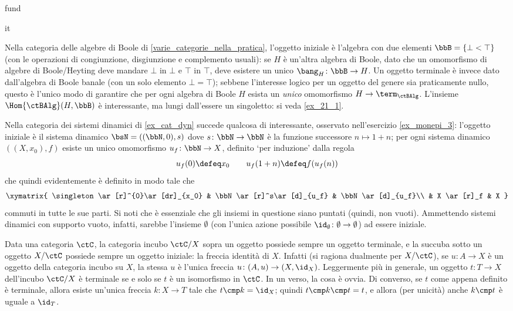 \begin{hExamples}{fund}
\begin{enumtag}{it}
		\item\label{it_4} Nella categoria delle algebre di Boole di \ref{varie_categorie_nella_pratica}, l'oggetto iniziale è l'algebra con due elementi \(\bbB=\{\bot < \top\}\) (con le operazioni di congiunzione, disgiunzione e complemento usuali): se \(H\) è un'altra algebra di Boole, dato che un omomorfismo di algebre di Boole/Heyting deve mandare \(\bot\) in \(\bot\) e \(\top\) in \(\top\), deve esistere un unico \(\bang_H \colon \bbB \to H\). Un oggetto terminale è invece dato dall'algebra di Boole banale (con un solo elemento \(\bot=\top\)); sebbene l'interesse logico per un oggetto del genere sia praticamente nullo, questo è l'unico modo di garantire che per ogni algebra di Boole \(H\) esista un \emph{unico} omomorfismo \(H \to \term_\ctBAlg\). L'insieme \(\Hom{\ctBAlg}(H,\bbB)\) è interessante, ma lungi dall'essere un singoletto: si veda \ref{ex_21_1}.
		\item\label{it_5} Nella categoria dei sistemi dinamici di \ref{ex_cat_dyn} succede qualcosa di interessante, osservato nell'esercizio \ref{ex_monepi_3}: l'oggetto iniziale è il sistema dinamico \(\bsN=((\bbN,0),s)\) dove \(s \colon \bbN \to \bbN\) è la funzione successore \(n\mapsto 1+n\);
		per ogni sistema dinamico \(((X,x_0),f)\) esiste un unico omomorfismo \(u_f \colon \bbN \to X\), definito `per induzione' dalla regola
		\[u_f(0) \defeq  x_0 \qquad u_f(1+n) \defeq  f(u_f(n))\]
		che quindi evidentemente è definito in modo tale che
		\[\xymatrix{
				\singleton\ar[r]^{0}\ar[dr]_{x_0} & \bbN\ar[r]^s\ar[d]_{u_f} & \bbN \ar[d]_{u_f}\\
				& X \ar[r]_f & X
			}\]
		commuti in tutte le sue parti. Si noti che è essenziale che gli insiemi in questione siano puntati (quindi, non vuoti). Ammettendo sistemi dinamici con supporto vuoto, infatti, sarebbe l'insieme \(\emptyset\) (con l'unica azione possibile \(\id_\emptyset \colon \emptyset \to \emptyset\)) ad essere iniziale.
		\item\label{it_6} Data una categoria \(\ctC\), la categoria incubo \(\ctC/X\) sopra un oggetto possiede sempre un oggetto terminale, e la succuba sotto un oggetto \(X/\ctC\) possiede sempre un oggetto iniziale: la freccia identità di \(X\). Infatti (si ragiona dualmente per \(X/\ctC\)), se \(u \colon A \to X\) è un oggetto della categoria incubo su \(X\), la stessa \(u\) è l'unica freccia \(u \colon (A,u) \to (X,\id_X)\). Leggermente più in generale, un oggetto \(t \colon T \to X\) dell'incubo \(\ctC/X\) è terminale se e solo se \(t\) è un isomorfismo in \(\ctC\). In un verso, la cosa è ovvia. Di converso, se \(t\) come appena definito è terminale, allora esiste un'unica freccia \(k \colon X \to T\) tale che \(t\cmp k = \id_X\); quindi \(t\cmp k \cmp t = t\), e allora (per unicità) anche \(k\cmp t\) è uguale a \(\id_T\).

\end{enumtag}
\end{hExamples}
